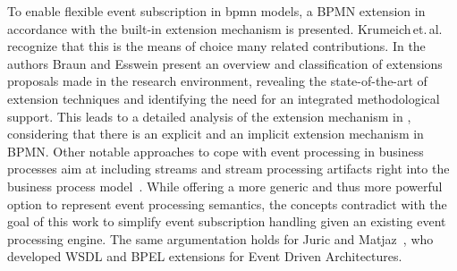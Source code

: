 

To enable flexible event subscription in bpmn models, a BPMN extension in accordance with the built-in extension mechanism is presented.
Krumeich\,et.\,al.\,\cite{Krumeich2014EventDrivenBP} recognize that this is the means of choice many related contributions.
In \cite{braun2014classification} the authors Braun and Esswein present an overview and classification of extensions proposals made in the research environment, revealing the state-of-the-art of extension techniques and identifying the need for an integrated methodological support. This leads to a detailed analysis of the extension mechanism in \cite{braun2015behind}, considering that there is an explicit and an implicit extension mechanism in BPMN.
Other notable approaches to cope with event processing in business processes aim at including streams and stream processing artifacts right into the business process model~\cite{appel2014modeling,biornstad2006control}. While offering a more generic and thus more powerful option to represent event processing semantics, the concepts contradict with the goal of this work to simplify event subscription handling given an existing event processing engine.
The same argumentation holds for Juric and Matjaz~\cite{juric2010wsdl}, who developed WSDL and BPEL extensions for Event Driven Architectures.

